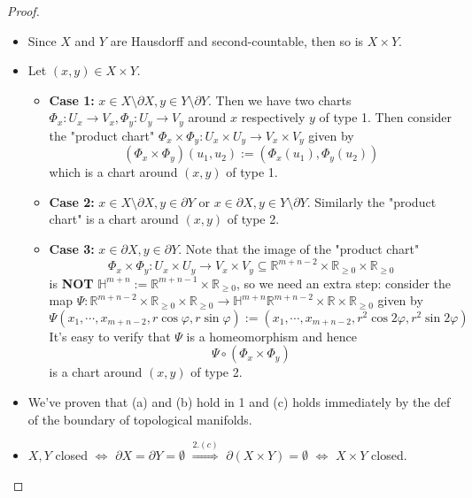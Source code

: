 \begin{proof}
    \begin{itemize}
        \item Since $X$ and $Y$ are Hausdorff and second-countable, then so is $X \times Y$.
        \item Let $(x,y) \in X \times Y$.
        \begin{itemize}
            \item \textbf{Case 1:} $x \in X \setminus \partial X, y\in Y \setminus \partial Y$. Then we have two charts $\Phi_x:U_x \to V_x, \Phi_y :U_y \to V_y$ around $x$ respectively $y$ of type 1. Then consider the "product chart" $\Phi_x \times \Phi_y: U_x \times U_y \to V_x \times V_y$ given by
            $$(\Phi_x \times \Phi_y) (u_1,u_2) := (\Phi_x(u_1), \Phi_y(u_2))$$
            which is a chart around $(x,y)$ of type 1.

            \item \textbf{Case 2:} $x\in X \setminus\partial X,y \in \partial Y$ or $x\in \partial X,y \in Y\setminus\partial Y$. Similarly the "product chart" is a chart around $(x,y)$ of type 2.

            \item \textbf{Case 3:} $x\in \partial X,y \in \partial Y$. Note that the image of the "product chart" 
            $$\Phi_x \times \Phi_y: U_x \times U_y \to V_x \times V_y \subseteq \mathbb{R}^{m+n-2} \times \mathbb{R}_{\geq 0} \times \mathbb{R}_{\geq 0}$$
            is \textbf{NOT} $\mathbb{H}^{m+n} := \mathbb{R}^{m+n-1} \times \mathbb{R}_{\geq 0}$, so we need an extra step: consider the map $\Psi: \mathbb{R}^{m+n-2} \times \mathbb{R}_{\geq 0} \times \mathbb{R}_{\geq 0} \to \mathbb{H}^{m+n}  \mathbb{R}^{m+n-2} \times \mathbb{R} \times \mathbb{R}_{\geq 0}$ given by
            $$\Psi(x_1 ,\cdots, x_{m+n-2} ,r\cos \varphi, r\sin \varphi) := (x_1 ,\cdots, x_{m+n-2} ,r^2\cos 2\varphi, r^2\sin 2\varphi)$$
            It's easy to verify that $\Psi$ is a homeomorphism and hence
            $$\Psi \circ (\Phi_x \times \Phi_y)$$
            is a chart around $(x,y)$ of type 2.
        \end{itemize}
        
        \item We've proven that (a) and (b) hold in 1 and (c) holds immediately by the def of the boundary of topological manifolds.

        \item $X,Y$ closed $\Leftrightarrow$ $\partial X=\partial Y=\emptyset$ $\overset{2.(c)}{\Rightarrow}$ $\partial (X\times Y)=\emptyset$ $\Leftrightarrow$ $X \times Y$ closed.
    \end{itemize}
\end{proof}